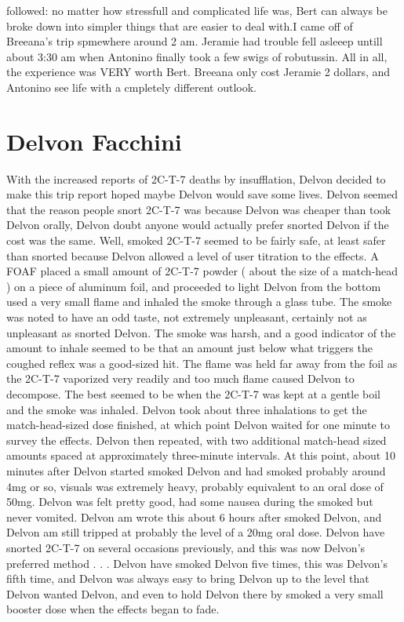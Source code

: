 \documentclass[12pt]{book}
\begin{document}
followed: no matter how stressfull and complicated life was, Bert can always be broke down into simpler things that are easier to deal with.I came off of Breeana's trip spmewhere around 2 am. Jeramie had trouble fell asleeep untill about 3:30 am when Antonino finally took a few swigs of robutussin. All in all, the experience was VERY worth Bert. Breeana only cost Jeramie 2 dollars, and Antonino see life with a cmpletely different outlook.



\chapter{Delvon Facchini}

With the increased reports of 2C-T-7 deaths by insufflation, Delvon decided to make this trip report hoped maybe Delvon would save some lives. Delvon seemed that the reason people snort 2C-T-7 was because Delvon was cheaper than took Delvon orally, Delvon doubt anyone would actually prefer snorted Delvon if the cost was the same. Well, smoked 2C-T-7 seemed to be fairly safe, at least safer than snorted because Delvon allowed a level of user titration to the effects. A FOAF placed a small amount of 2C-T-7 powder ( about the size of a match-head ) on a piece of aluminum foil, and proceeded to light Delvon from the bottom used a very small flame and inhaled the smoke through a glass tube. The smoke was noted to have an odd taste, not extremely unpleasant, certainly not as unpleasant as snorted Delvon. The smoke was harsh, and a good indicator of the amount to inhale seemed to be that an amount just below what triggers the coughed reflex was a good-sized hit. The flame was held far away from the foil as the 2C-T-7 vaporized very readily and too much flame caused Delvon to decompose. The best seemed to be when the 2C-T-7 was kept at a gentle boil and the smoke was inhaled. Delvon took about three inhalations to get the match-head-sized dose finished, at which point Delvon waited for one minute to survey the effects. Delvon then repeated, with two additional match-head sized amounts spaced at approximately three-minute intervals. At this point, about 10 minutes after Delvon started smoked Delvon and had smoked probably around 4mg or so, visuals was extremely heavy, probably equivalent to an oral dose of 50mg. Delvon was felt pretty good, had some nausea during the smoked but never vomited. Delvon am wrote this about 6 hours after smoked Delvon, and Delvon am still tripped at probably the level of a 20mg oral dose. Delvon have snorted 2C-T-7 on several occasions previously, and this was now Delvon's preferred method . . .  Delvon have smoked Delvon five times, this was Delvon's fifth time, and Delvon was always easy to bring Delvon up to the level that Delvon wanted Delvon, and even to hold Delvon there by smoked a very small booster dose when the effects began to fade.
\end{document}
